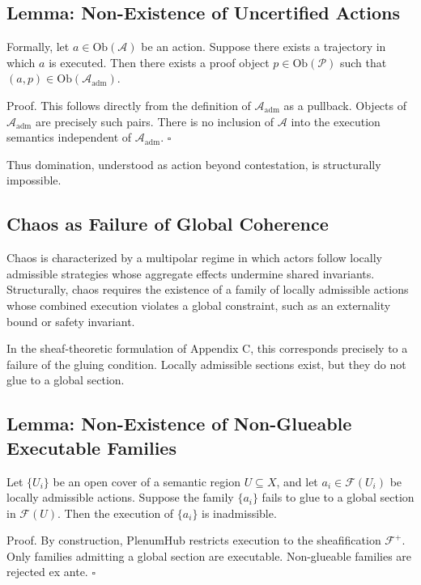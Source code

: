 \documentclass[11pt,oneside]{article}
\begin{document}
\subsection{Lemma: Non-Existence of Uncertified Actions}

Formally, let \( a \in \mathrm{Ob}(\mathcal{A}) \) be an action. Suppose there exists a trajectory in which \( a \) is executed. Then there exists a proof object \( p \in \mathrm{Ob}(\mathcal{P}) \) such that \( (a,p) \in \mathrm{Ob}(\mathcal{A}_{\mathrm{adm}}) \).

Proof. This follows directly from the definition of \( \mathcal{A}_{\mathrm{adm}} \) as a pullback. Objects of \( \mathcal{A}_{\mathrm{adm}} \) are precisely such pairs. There is no inclusion of \( \mathcal{A} \) into the execution semantics independent of \( \mathcal{A}_{\mathrm{adm}} \). \(\square\)

Thus domination, understood as action beyond contestation, is structurally impossible.

\subsection{Chaos as Failure of Global Coherence}

Chaos is characterized by a multipolar regime in which actors follow locally admissible strategies whose aggregate effects undermine shared invariants. Structurally, chaos requires the existence of a family of locally admissible actions whose combined execution violates a global constraint, such as an externality bound or safety invariant.

In the sheaf-theoretic formulation of Appendix C, this corresponds precisely to a failure of the gluing condition. Locally admissible sections exist, but they do not glue to a global section.

\subsection{Lemma: Non-Existence of Non-Glueable Executable Families}

Let \( \{U_i\} \) be an open cover of a semantic region \( U \subseteq X \), and let \( a_i \in \mathcal{F}(U_i) \) be locally admissible actions. Suppose the family \( \{a_i\} \) fails to glue to a global section in \( \mathcal{F}(U) \). Then the execution of \( \{a_i\} \) is inadmissible.

Proof. By construction, PlenumHub restricts execution to the sheafification \( \mathcal{F}^{+} \). Only families admitting a global section are executable. Non-glueable families are rejected ex ante. \(\square\)
\end{document}
